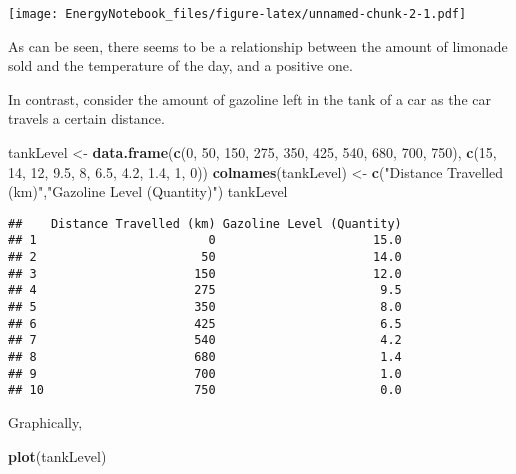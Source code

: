 \documentclass[]{article}
\newenvironment{Shaded}{\begin{snugshade}}{\end{snugshade}}
\newcommand{\KeywordTok}[1]{\textcolor[rgb]{0.13,0.29,0.53}{\textbf{#1}}}
\newcommand{\DecValTok}[1]{\textcolor[rgb]{0.00,0.00,0.81}{#1}}
\newcommand{\FloatTok}[1]{\textcolor[rgb]{0.00,0.00,0.81}{#1}}
\newcommand{\StringTok}[1]{\textcolor[rgb]{0.31,0.60,0.02}{#1}}
\newcommand{\NormalTok}[1]{#1}
\begin{document}
\texttt{[image: EnergyNotebook\_files/figure-latex/unnamed-chunk-2-1.pdf]}

As can be seen, there seems to be a relationship between the amount of
limonade sold and the temperature of the day, and a positive one.

In contrast, consider the amount of gazoline left in the tank of a car
as the car travels a certain distance.

\begin{Shaded}
\begin{Highlighting}[]
\NormalTok{tankLevel <-}\StringTok{ }\KeywordTok{data.frame}\NormalTok{(}\KeywordTok{c}\NormalTok{(}\DecValTok{0}\NormalTok{, }\DecValTok{50}\NormalTok{, }\DecValTok{150}\NormalTok{, }\DecValTok{275}\NormalTok{, }\DecValTok{350}\NormalTok{, }\DecValTok{425}\NormalTok{, }\DecValTok{540}\NormalTok{, }\DecValTok{680}\NormalTok{, }\DecValTok{700}\NormalTok{, }\DecValTok{750}\NormalTok{),}
                    \KeywordTok{c}\NormalTok{(}\DecValTok{15}\NormalTok{, }\DecValTok{14}\NormalTok{, }\DecValTok{12}\NormalTok{, }\FloatTok{9.5}\NormalTok{, }\DecValTok{8}\NormalTok{, }\FloatTok{6.5}\NormalTok{, }\FloatTok{4.2}\NormalTok{, }\FloatTok{1.4}\NormalTok{, }\DecValTok{1}\NormalTok{, }\DecValTok{0}\NormalTok{))}
\KeywordTok{colnames}\NormalTok{(tankLevel) <-}\StringTok{ }\KeywordTok{c}\NormalTok{(}\StringTok{"Distance Travelled (km)"}\NormalTok{,}\StringTok{"Gazoline Level (Quantity)"}\NormalTok{)}
\NormalTok{tankLevel}
\end{Highlighting}
\end{Shaded}

\begin{verbatim}
##    Distance Travelled (km) Gazoline Level (Quantity)
## 1                        0                      15.0
## 2                       50                      14.0
## 3                      150                      12.0
## 4                      275                       9.5
## 5                      350                       8.0
## 6                      425                       6.5
## 7                      540                       4.2
## 8                      680                       1.4
## 9                      700                       1.0
## 10                     750                       0.0
\end{verbatim}

Graphically,

\begin{Shaded}
\begin{Highlighting}[]
\KeywordTok{plot}\NormalTok{(tankLevel)}
\end{Highlighting}
\end{Shaded}
\end{document}
